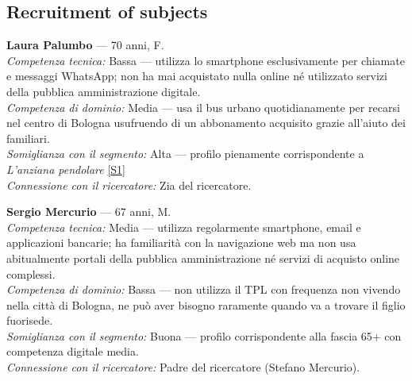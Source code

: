 ﻿\documentclass[11pt,a4paper]{article}
\begin{document}
\vspace{0.2cm}

\subsection*{Recruitment of subjects}
\begin{tcolorbox}[base]

\textbf{Laura Palumbo} --- 70 anni, F.\\[0.3cm]
\textit{Competenza tecnica:} Bassa --- utilizza lo smartphone
esclusivamente per chiamate e messaggi WhatsApp; non ha mai
acquistato nulla online né utilizzato servizi della pubblica
amministrazione digitale.\\[0.2cm]
\textit{Competenza di dominio:} Media --- usa il bus urbano
quotidianamente per recarsi nel centro di Bologna usufruendo
di un abbonamento acquisito grazie all'aiuto dei familiari.\\[0.2cm]
\textit{Somiglianza con il segmento:} Alta --- profilo
pienamente corrispondente a \textit{L'anziana pendolare}
\hyperref[seg:anziana]{[S1]}\\[0.2cm]
\textit{Connessione con il ricercatore:} Zia del ricercatore.

\vspace{0.2cm}

\textbf{Sergio Mercurio} --- 67 anni, M.\\[0.3cm]
\textit{Competenza tecnica:} Media --- utilizza regolarmente
smartphone, email e applicazioni bancarie; ha familiarità
con la navigazione web ma non usa abitualmente portali
della pubblica amministrazione né servizi di acquisto
online complessi.\\[0.2cm]
\textit{Competenza di dominio:} Bassa --- non utilizza
il TPL con frequenza non vivendo nella città di Bologna, ne può aver bisogno raramente quando va a trovare il figlio fuorisede.\\[0.2cm]
\textit{Somiglianza con il segmento:} Buona --- profilo
corrispondente alla fascia 65+ con competenza digitale media.\\[0.2cm]
\textit{Connessione con il ricercatore:} Padre del
ricercatore (Stefano Mercurio).

\vspace{0.2cm}


\end{tcolorbox}
\end{document}
